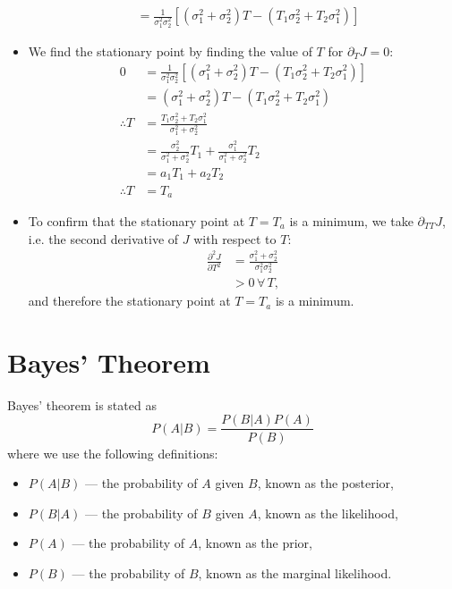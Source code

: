 \begin{itemize}
\begin{align}
        &= \frac{1}{\sigma_1^2 \sigma_2^2} \left[
            \left( \sigma_1^2 + \sigma_2^2 \right) T 
            - \left( T_1 \sigma_2^2 + T_2 \sigma_1^2 \right)
        \right]
    \end{align}
    \item We find the stationary point by finding the value of $T$ for $\partial_T J = 0$:
    \begin{align}
        0 &= \frac{1}{\sigma_1^2 \sigma_2^2} \left[
            \left( \sigma_1^2 + \sigma_2^2 \right) T 
            - \left( T_1 \sigma_2^2 + T_2 \sigma_1^2 \right)
        \right] \nonumber \\
            &= \left( \sigma_1^2 + \sigma_2^2 \right) T 
                - \left( T_1 \sigma_2^2 + T_2 \sigma_1^2 \right) \nonumber \\
        \therefore T &= \frac{T_1 \sigma_2^2 +T_2 \sigma_1^2}{\sigma_1^2 + \sigma_2^2} \nonumber \\
            &= \frac{\sigma_2^2}{\sigma_1^2 + \sigma_2^2} T_1
                + \frac{\sigma_1^2}{\sigma_1^2 + \sigma_2^2} T_2 \nonumber \\
            &= a_1 T_1 + a_2 T_2 \nonumber \\
        \therefore T &= T_a  
    \end{align}
    \item To confirm that the stationary point at $T = T_a$ is a minimum, we take $\partial_{TT} J$, i.e. the second derivative of $J$ with respect to $T$:
    \begin{align*}
        \frac{\partial^2 J}{\partial T^2} &= \frac{\sigma_1^2 + \sigma_2^2}{\sigma_1^2 \sigma_2^2} \\
            &> 0 \, \forall \, T,
    \end{align*}
    and therefore the stationary point at $T = T_a$ is a minimum.
\end{itemize}

\section{Bayes' Theorem}
\label{sec:kalnay_working:cost}

Bayes' theorem is stated as
\begin{equation}
    P \left( A | B \right)
    =
    \frac{P \left( B | A \right) P \left( A \right)}{P \left( B \right)}
\end{equation}
where we use the following definitions:
\begin{itemize}
    \item $P \left( A | B \right)$ --- the probability of $A$ given $B$, known as the posterior,
    \item $P \left( B | A \right)$ --- the probability of $B$ given $A$, known as the likelihood,
    \item $P \left( A \right)$ --- the probability of $A$, known as the prior,
    \item $P \left( B \right)$ --- the probability of $B$, known as the marginal likelihood.
\end{itemize}